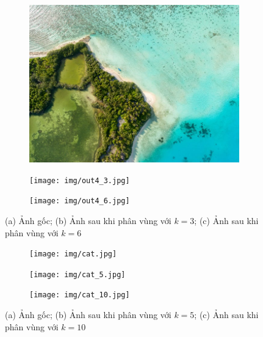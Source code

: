 \documentclass{article}
\begin{document}
    \begin{figure}[H]
        \centering
        \begin{subfigure}[b]{0.3\textwidth}
            \centering
            \includegraphics[width=\textwidth,height=\textheight,keepaspectratio]{img/in4.jpg}
            \caption{}
        \end{subfigure}
        \begin{subfigure}[b]{0.3\textwidth}
            \centering
            \texttt{[image: img/out4\_3.jpg]}
            \caption{}
        \end{subfigure}
         \begin{subfigure}[b]{0.3\textwidth}
            \centering
            \texttt{[image: img/out4\_6.jpg]}
            \caption{}
        \end{subfigure}
        \caption{(a) Ảnh gốc; (b) Ảnh sau khi phân vùng với $k=3$; (c) Ảnh sau khi phân vùng với $k=6$}
    \end{figure}

    \begin{figure}[H]
        \centering
        \begin{subfigure}[b]{0.3\textwidth}
            \centering
            \texttt{[image: img/cat.jpg]}
            \caption{}
        \end{subfigure}
        \begin{subfigure}[b]{0.3\textwidth}
            \centering
            \texttt{[image: img/cat\_5.jpg]}
            \caption{}
        \end{subfigure}
         \begin{subfigure}[b]{0.3\textwidth}
            \centering
            \texttt{[image: img/cat\_10.jpg]}
            \caption{}
        \end{subfigure}
        \caption{(a) Ảnh gốc; (b) Ảnh sau khi phân vùng với $k=5$; (c) Ảnh sau khi phân vùng với $k=10$}
    \end{figure}
\end{document}
